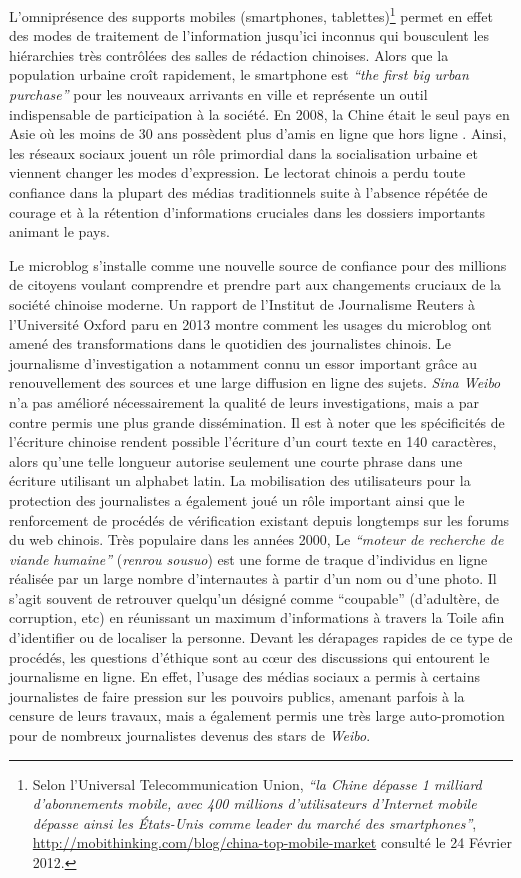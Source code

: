L’omniprésence des supports mobiles (smartphones, tablettes)\footnote{Selon l’Universal Telecommunication Union, \textit{``la Chine dépasse 1 milliard d’abonnements mobile, avec 400 millions d’utilisateurs d’Internet mobile dépasse ainsi les États-Unis comme leader du marché des smartphones''}, \url{http://mobithinking.com/blog/china-top-mobile-market} consulté le 24 Février 2012.} permet en effet des modes de traitement de l’information jusqu’ici inconnus qui bousculent les hiérarchies très contrôlées des salles de rédaction chinoises. Alors que la population urbaine croît rapidement, le smartphone est \textit{``the first big urban purchase''} \citep{Wallis2013} pour les nouveaux arrivants en ville et représente un outil indispensable de participation à la société. En 2008, la Chine était le seul pays en Asie où les moins de 30 ans possèdent plus d’amis en ligne que hors ligne \citep{Hinckley2009}. Ainsi, les réseaux sociaux jouent un rôle primordial dans la socialisation urbaine et viennent changer les modes d’expression. Le lectorat chinois a perdu toute confiance dans la plupart des médias traditionnels suite à l’absence répétée de courage et à la rétention d’informations cruciales dans les dossiers importants animant le pays. 

Le microblog s’installe comme une nouvelle source de confiance pour des millions de citoyens voulant comprendre et prendre part aux changements cruciaux de la société chinoise moderne. Un rapport de l’Institut de Journalisme Reuters à l’Université Oxford paru en 2013 montre comment les usages du microblog ont amené des transformations dans le quotidien des journalistes chinois. Le journalisme d’investigation a notamment connu un essor important grâce au renouvellement des sources et une large diffusion en ligne des sujets. \textit{Sina Weibo} n’a pas amélioré nécessairement la qualité de leurs investigations, mais a par contre permis une plus grande dissémination. Il est à noter que les spécificités de l’écriture chinoise rendent possible l’écriture d’un court texte en 140 caractères, alors qu’une telle longueur autorise seulement une courte phrase dans une écriture utilisant un alphabet latin. La mobilisation des utilisateurs pour la protection des journalistes a également joué un rôle important ainsi que le renforcement de procédés de vérification existant depuis longtemps sur les forums du web chinois. Très populaire dans les années 2000, Le \textit{``moteur de recherche de viande humaine''} (\textit{renrou sousuo}) est une forme de traque d’individus en ligne réalisée par un large nombre d’internautes à partir d’un nom ou d’une photo. Il s’agit souvent de retrouver quelqu’un désigné comme ``coupable'' (d’adultère, de corruption, etc) en réunissant un maximum d’informations à travers la Toile afin d’identifier ou de localiser la personne. Devant les dérapages rapides de ce type de procédés, les questions d’éthique sont au cœur des discussions qui entourent le journalisme en ligne. En effet, l’usage des médias sociaux a permis à certains journalistes de faire pression sur les pouvoirs publics, amenant parfois à la censure de leurs travaux, mais a également permis une très large auto-promotion pour de nombreux journalistes devenus des stars de \textit{Weibo}.

